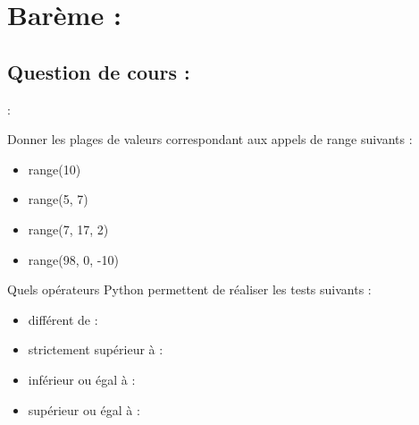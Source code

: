 \documentclass[a4paper, noanswers, addpoints, 12pt]{exam}
\begin{document}
\section*{Barème :}
\begin{center}
  \par\bigskip
  \gradetable[h]
\end{center}
\begin{questions}

\section{Question de cours : }

\question[2]  :

\question[2] Donner les plages de valeurs correspondant aux appels de range suivants :
\begin{itemize}
    \item range(10)
    \item range(5, 7)
    \item range(7, 17, 2)
    \item range(98, 0, -10)
\end{itemize}

\question[2] Quels opérateurs Python permettent de réaliser les tests suivants :
\begin{itemize}
    \item différent de :
    \item strictement supérieur à :
    \item inférieur ou égal à :
    \item supérieur ou égal à :
\end{itemize}
 

\end{questions}
\end{document}
